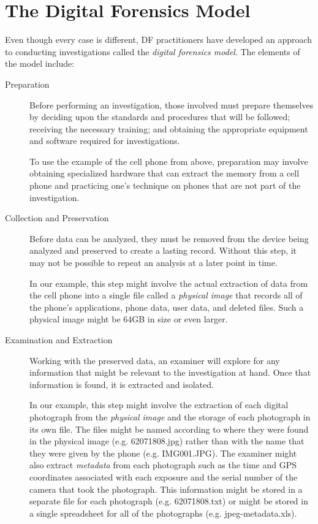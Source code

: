 \section{The Digital Forensics Model \TODO}

Even though every case is different, DF practitioners have developed an
approach to conducting investigations called the 
\emph{digital forensics model}\cite{pollitt:models}. The 
elements of the model include:

\begin{description}
\item[Preparation] Before performing an investigation, those involved
  must prepare themselves by deciding upon the standards and
  procedures that will be followed; receiving the necessary training;
  and obtaining the appropriate equipment and software required for
  investigations. 

  To use the example of the cell phone from above,
  preparation may involve obtaining specialized hardware that can extract the
  memory from a cell phone and practicing one's technique on phones that are not part
  of the investigation.

\item[Collection and Preservation]
  Before data can be analyzed, they   must be removed from the
  device being analyzed and preserved to create a lasting
  record. Without this step, it may not be possible to repeat an
  analysis at a later point in time. 

  In our example, this step might involve the actual extraction of data
  from the cell phone into a single file called a \emph{physical
    image} that records all of the phone's applications, phone data, user data,
  and deleted files. Such a physical image might be 64GB in size or
  even larger.

\item[Examination and Extraction] Working with the preserved data, an
  examiner will explore for any information that might be
  relevant to the investigation at hand. Once that information is
  found, it is extracted and isolated.

  In our example, this step might involve the extraction of each
  digital photograph from the \emph{physical image} and the storage of
  each photograph in its own file. The files might be named according
  to where they were found in the physical image (e.g. 62071808.jpg)
  rather than with the name that they were given by the phone
  (e.g. IMG001.JPG). The examiner might also extract \emph{metadata}
  from each photograph such as the time and GPS coordinates associated
  with each exposure and the serial number of the camera that took the
  photograph. This information might be stored in a separate file for
  each photograph (e.g. 62071808.txt) or might be stored in a single
  spreadsheet for all of the photographs (e.g. jpeg-metadata.xls).


\end{description}
